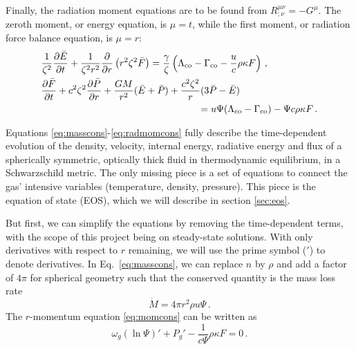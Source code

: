 \documentclass[../main.tex]{subfiles}
\begin{document}
Finally, the radiation moment equations are to be found from 
$R^{\mu\nu}_{;\nu}=-G^\mu$. The zeroth moment, or energy equation, is $\mu=t$, while the first moment, or radiation force balance equation, is $\mu=r$:
\begin{align}
    &\frac{1}{\zeta^2}\frac{\partial \bar{E}}{\partial t}+\frac{1}{\zeta^2r^2}\Partial{r}{r^2\zeta^2\bar{F}}=\frac{\gamma}{\zeta}\left(\Lambda_\text{co}-\Gamma_\text{co}-\frac{u}{c}\rho\kappa F\right)\label{eq:radenercons}\,,\\
    &\frac{\partial \bar{F}}{\partial t}+c^2\zeta^2\frac{\partial\bar{P}}{\partial r}+\frac{GM}{r^2}(\bar{E}+\bar{P})+\frac{c^2\zeta^2}{r}(3\bar{P}-\bar{E})\nonumber\\
    &\hspace*{5cm}\qquad=u\Psi(\Lambda_\text{co}-\Gamma_\text{co})-\Psi c\rho\kappa F\,.\label{eq:radmomcons}
\end{align}

Equations \eqref{eq:masscons}-\eqref{eq:radmomcons} fully describe the time-dependent evolution of the density, velocity, internal energy, radiative energy and flux of a spherically symmetric, optically thick fluid in thermodynamic equilibrium, in a Schwarzschild metric. The only missing piece is a set of equations to connect the gas' intensive variables (temperature, density, pressure). This piece is the equation of state (EOS), which we will describe in section \ref{sec:eos}.   

But first, we can simplify the equations by removing the time-dependent terms, with the scope of this project being on steady-state solutions. With only derivatives with respect to $r$ remaining, we will use the prime symbol ($'$) to denote derivatives. In Eq.~\eqref{eq:masscons}, we can replace $n$ by $\rho$ and add a factor of $4\pi$ for spherical geometry such that the conserved quantity is the mass loss rate
\begin{equation}\label{eq:Mdot}
    \boxed{\dot{M}=4\pi r^2\rho u\Psi}\,.
\end{equation}
The $r$-momentum equation \eqref{eq:momcons} can be written as
\begin{equation}\label{eq:stationarymomcons}
     \boxed{\omega_g(\ln\Psi)' + P_g' - \frac{1}{c\Psi}\rho\kappa F = 0}\,.
\end{equation}
\end{document}
